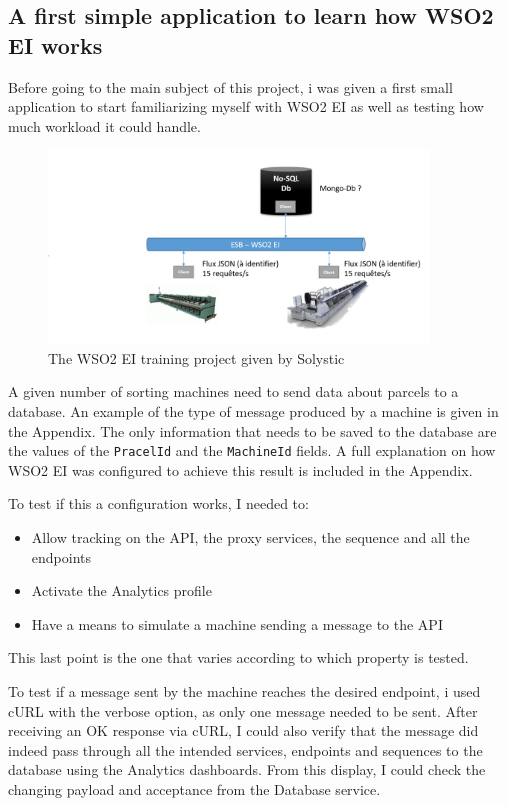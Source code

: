 \documentclass[12pt,a4paper,twoside]{article}
\begin{document}
\subsection{A first simple application to learn how WSO2 EI works}
Before going to the main subject of this project, i was given a first small application to start familiarizing myself with WSO2 EI as well as testing how much workload it could handle. \\
\begin{figure}[H]
\centering
\includegraphics[width=0.9\textwidth]{mini_projet.PNG}
\caption{\label{training maquette}The WSO2 EI training project given by Solystic}
\end{figure}


A given number of sorting machines need to send data about parcels to a database. An example of the type of message produced by a machine is given in the Appendix. The only information that needs to be saved to the database are the values of the \texttt{PracelId} and the \texttt{MachineId} fields. A full explanation on how WSO2 EI was configured to achieve this result is included in the Appendix. 

To test if this a configuration works, I needed to:
\begin{itemize}
\item Allow tracking on the API, the proxy services, the sequence and all the endpoints
\item Activate the Analytics profile
\item Have a means to simulate a machine sending a message to the API
\end{itemize}

This last point is the one that varies according to which property is tested.

To test if a message sent by the machine reaches the desired endpoint, i used cURL with the verbose option, as only one message needed to be sent. After receiving an OK response via cURL, I could also verify that the message did indeed pass through all the intended services, endpoints and sequences to the database using the Analytics dashboards. From this display, I could check the changing payload and acceptance from the Database service.
\end{document}
